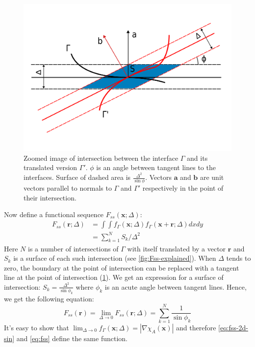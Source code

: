 \documentclass[reprint,amsmath,amssymb,aps,pre,showkeys,showpacs]{revtex4-1}
\begin{document}
\begin{figure}
  \centering
  \includegraphics[width=0.8\linewidth]{images/fss-zoomed.png}
  \caption[]{Zoomed image of intersection between the interface $\Gamma$ and its
    translated version $\Gamma'$. $\phi$ is an angle between tangent lines to
    the interfaces. Surface of dashed area is
    $\frac{\Delta^2}{\sin \phi}$. Vectors $\bm{a}$ and $\bm{b}$ are unit vectors
    parallel to normals to $\Gamma$ and $\Gamma'$ respectively in the point of
    their intersection.}
  \label{fig:fss-zoomed}
\end{figure}
Now define a functional sequence $F_{ss}(\bm{x}; \Delta)$:
\begin{align*}
  F_{ss}(\bm{r}; \Delta) &= \int\int f_\Gamma(\bm{x}; \Delta) f_\Gamma(\bm{x}
  + \bm{r}; \Delta) dx dy \\
  &= \sum_{k=1}^N S_k/\Delta^2
\end{align*}
Here $N$ is a number of intersections of $\Gamma$ with itself translated by a
vector $\bm{r}$ and $S_k$ is a surface of each such intersection (see
\cref{fig:Fss-explained}).
When $\Delta$ tends to zero, the boundary at the point of intersection can
be replaced with a tangent line at the point of intersection
(\cref{fig:fss-zoomed}). We get an expression for a surface of
intersection: $S_k = \frac{\Delta^2}{\sin \phi_k}$ where $\phi_k$ is an
acute angle between tangent lines. Hence, we get the following equation:
\begin{equation}
  F_{ss}(\bm{r}) = \lim_{\Delta \to 0} F_{ss}(\bm{r}; \Delta) =
  \sum_{k=1}^N \frac{1}{\sin \phi_k} \label{eq:fss-2d-sin}
\end{equation}
It's easy to show that
$\lim_{\Delta \to 0} f_\Gamma(\bm{x}; \Delta) = |\nabla \chi_A(\bm{x})|$
and therefore \cref{eq:fss-2d-sin} and \cref{eq:fss} define the same function.
\end{document}
